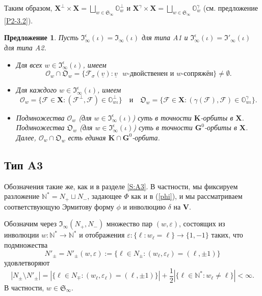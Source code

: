 \documentclass{amsart}
\newtheorem{proposition}{Предложение}
\theoremstyle{definition}
\newcommand{\NN}{\mathbb{N}^*}
\newcommand{\bs}[1]{\boldsymbol{#1}}
\begin{document}
\medskip
Таким образом,
$\displaystyle \mathbf{X}^\perp\times\mathbf{X}=\bigsqcup_{w\in\mathfrak{S}_\infty}\pmb{\mathbb{O}}^\perp_w$
и
$\displaystyle \mathbf{X}^\gamma\times\mathbf{X}=\bigsqcup_{w\in\mathfrak{S}_\infty}\pmb{\mathbb{O}}^\gamma_w$
(см. предложение \ref{P2-3.2}).


\begin{proposition}
\label{P4-1.1}
Пусть $\mathfrak{I}^\epsilon_\infty(\iota)=\mathfrak{I}_\infty(\iota)$ для типа A1
и $\mathfrak{I}^\epsilon_\infty(\iota)=\mathfrak{I}'_\infty(\iota)$ для типа A2.
\begin{itemize}
\item[\rm (a)] Для всех $w\in\mathfrak{I}^\epsilon_\infty(\iota)$, имеем \[\bs{\mathcal{O}}_w\cap\bs{\mathfrak{O}}_w=\{\mathcal{F}_\sigma(\underline{v}):\mbox{$\underline{v}$  $w$-двойственен и $w$-сопряжён}\}\not=\emptyset.\]
\item[\rm (b)] Для каждого $w\in\mathfrak{I}^\epsilon_\infty(\iota)$, имеем
\[
\bs{\mathcal{O}}_w=\{\mathcal{F}\in\mathbf{X}:(\mathcal{F}^\perp,\mathcal{F})\in\pmb{\mathbb{O}}^\perp_{w\iota}\} \quad\mbox{и}\quad
\bs{\mathfrak{O}}_w=\{\mathcal{F}\in\mathbf{X}:(\gamma(\mathcal{F}),\mathcal{F})\in\pmb{\mathbb{O}}^\gamma_{w\iota}\}.
\]
\item[\rm (c)] Подмножества $\bs{\mathcal{O}}_w$ (для $w\in\mathfrak{I}^\epsilon_\infty(\iota)$) суть в точности $\mathbf{K}$-орбиты в $\mathbf{X}$.
Подмножества $\bs{\mathfrak{O}}_w$ (для $w\in\mathfrak{I}^\epsilon_\infty(\iota)$) суть в точности $\mathbf{G}^0$-орбиты в $\mathbf{X}$.
Далее, $\bs{\mathcal{O}}_w\cap\bs{\mathfrak{O}}_w$ есть единая $\mathbf{K}\cap\mathbf{G}^0$-орбита.
\end{itemize}
\end{proposition}

\subsection{Тип A3}

\label{S4.2}

Обозначения такие же, как и в разделе \ref{S:A3}.
В частности, мы фиксируем разложение $\NN=N_+\sqcup N_-$, задающее $\Phi$ как и в  (\ref{phi}), и мы рассматриваем соответствующую
Эрмитову форму $\phi$ и инволюцию $\delta$ на $\mathbf{V}$.

Обозначим через $\mathfrak{I}_\infty(N_+,N_-)$  множество пар $(w,\varepsilon)$, состоящих из инволюции $w:\NN\to\NN$ и отображения $\varepsilon:\{\ell:w_\ell=\ell\}\to\{1,-1\}$ таких, что подмножества
\[N'_\pm=N'_\pm(w,\varepsilon):=\{\ell\in N_\pm:(w_\ell,\varepsilon_\ell)=(\ell,\pm1)\}
\]
удовлетворяют
\[|N_\pm\setminus N'_\pm|=|\{\ell\in N_\mp:(w_\ell,\varepsilon_\ell)=(\ell,\pm 1)\}|+\frac{1}{2}|\{\ell\in\NN:w_\ell\not=\ell\}|<\infty.\]
В частности, $w\in\mathfrak{S}_\infty$.
\end{document}
